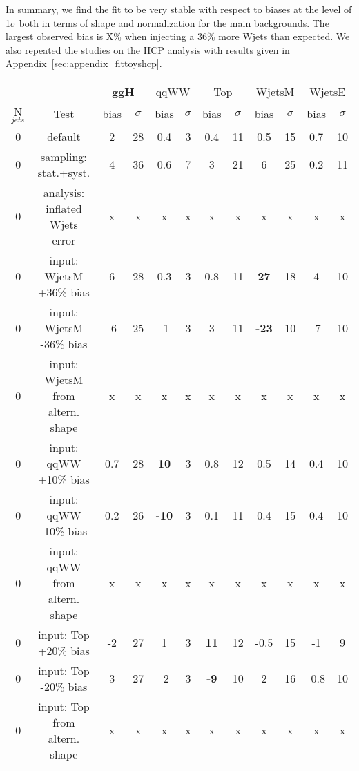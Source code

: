 In summary, we find the fit to be very stable with respect to biases at the level of 1$\sigma$ both in terms of shape and 
normalization for the main backgrounds. The largest observed bias is X\% when injecting a 36\% more Wjets than expected.
We also repeated the studies on the HCP analysis with results given in Appendix~\ref{sec:appendix_fittoyshcp}. 

\begin{table}
\begin{center}
\begin{tabular}{c | c  | c c | c c | c c | c c | c c }
\hline
          &      & \multicolumn{2}{c|}{{\bf ggH}} & \multicolumn{2}{c|}{qqWW} & \multicolumn{2}{c|}{Top} & \multicolumn{2}{c}{WjetsM} & \multicolumn{2}{c}{WjetsE} \\ 
N$_{jets}$ & Test & bias & $\sigma$ & bias & $\sigma$ & bias & $\sigma$ & bias & $\sigma$ & bias & $\sigma$ \\
\hline
0 & default                             &  2  & 28 & 0.4 & 3 & 0.4 & 11 & 0.5 & 15 & 0.7 & 10  \\
0 & sampling: stat.+syst.               &  4  & 36 & 0.6 & 7 &  3  & 21 &  6  & 25 & 0.2 & 11 \\
\hline
0 & analysis: inflated Wjets error      &  x   &  x & x   & x & x   & x  & x   & x  & x  & x\\
0 & input: WjetsM +36\% bias             & 6   & 28 & 0.3 & 3 & 0.8 & 11 & {\bf 27}  & 18 & 4  & 10  \\
0 & input: WjetsM -36\% bias             & -6  & 25  & -1 & 3 & 3   & 11 & {\bf -23} & 10 & -7  & 10\\
0 & input: WjetsM from altern. shape     & x   & x  & x   & x & x   & x  & x   & x  & x   & x\\
\hline
0 & input: qqWW +10\% bias              & 0.7 & 28 & {\bf 10}  & 3 & 0.8 & 12 & 0.5 & 14 & 0.4 & 10  \\
0 & input: qqWW -10\% bias              & 0.2 & 26 & {\bf -10} & 3 & 0.1 & 11 & 0.4 & 15 & 0.4 & 10 \\
0 & input: qqWW from altern. shape      & x   & x  & x   & x & x   & x  & x   & x  & x   & x\\
\hline
0 & input: Top +20\% bias               & -2  & 27  & 1   & 3 & {\bf 11} & 12  & -0.5 & 15  & -1   & 9\\
0 & input: Top -20\% bias               & 3   & 27  & -2  & 3 & {\bf -9} & 10  & 2    & 16  & -0.8 & 10\\
0 & input: Top from altern. shape       & x   & x  & x    & x & x   & x  & x   & x  & x   & x\\

\end{tabular}
\end{center}
\end{table}
